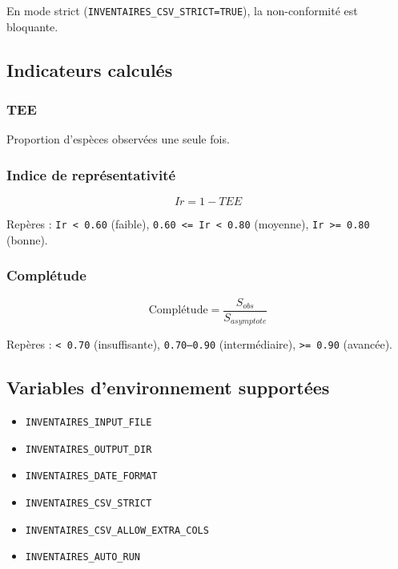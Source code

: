 \documentclass[11pt,a4paper]{article}
\begin{document}
\begin{warnbox}
En mode strict (\texttt{INVENTAIRES\_CSV\_STRICT=TRUE}), la non-conformité est bloquante.
\end{warnbox}

\subsection{Indicateurs calculés}

\subsubsection{TEE}
Proportion d'espèces observées une seule fois.

\subsubsection{Indice de représentativité}
\begin{formulebox}[Formule]
\[
Ir = 1 - TEE
\]
\end{formulebox}
Repères : \texttt{Ir < 0.60} (faible), \texttt{0.60 <= Ir < 0.80} (moyenne), \texttt{Ir >= 0.80} (bonne).

\subsubsection{Complétude}
\begin{formulebox}[Formule]
\[
\text{Complétude} = \frac{S_{obs}}{S_{asymptote}}
\]
\end{formulebox}
Repères : \texttt{< 0.70} (insuffisante), \texttt{0.70--0.90} (intermédiaire), \texttt{>= 0.90} (avancée).

\subsection{Variables d'environnement supportées}
\begin{itemize}
  \item \texttt{INVENTAIRES\_INPUT\_FILE}
  \item \texttt{INVENTAIRES\_OUTPUT\_DIR}
  \item \texttt{INVENTAIRES\_DATE\_FORMAT}
  \item \texttt{INVENTAIRES\_CSV\_STRICT}
  \item \texttt{INVENTAIRES\_CSV\_ALLOW\_EXTRA\_COLS}
  \item \texttt{INVENTAIRES\_AUTO\_RUN}
\end{itemize}
\end{document}
